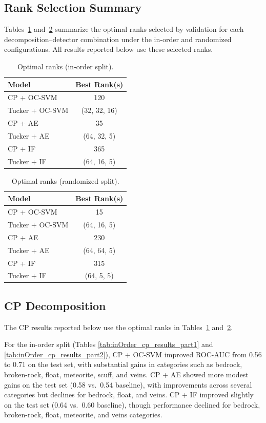 \documentclass[pdflatex,sn-mathphys-ay]{sn-jnl}
\begin{document}
\subsection{Rank Selection Summary}
Tables~\ref{tab:best_ranks_inorder} and~\ref{tab:best_ranks_random} summarize the optimal ranks selected by validation for each decomposition–detector combination under the in-order and randomized configurations. All results reported below use these selected ranks.

\begin{table}
\centering
\begin{tabular}{lc}
\hline
\textbf{Model} & \textbf{Best Rank(s)} \\
\hline
CP + OC-SVM    & 120 \\
Tucker + OC-SVM& (32, 32, 16) \\
CP + AE        & 35 \\
Tucker + AE    & (64, 32, 5) \\
CP + IF        & 365 \\
Tucker + IF    & (64, 16, 5) \\
\hline
\end{tabular}
\caption{Optimal ranks (in-order split).}
\label{tab:best_ranks_inorder}
\end{table}

\begin{table}
\centering
\begin{tabular}{lc}
\hline
\textbf{Model} & \textbf{Best Rank(s)} \\
\hline
CP + OC-SVM    & 15 \\
Tucker + OC-SVM& (64, 16, 5) \\
CP + AE        & 230 \\
Tucker + AE    & (64, 64, 5) \\
CP + IF        & 315 \\
Tucker + IF    & (64, 5, 5) \\
\hline
\end{tabular}
\caption{Optimal ranks (randomized split).}
\label{tab:best_ranks_random}
\end{table}

\subsection{CP Decomposition}
The CP results reported below use the optimal ranks in Tables~\ref{tab:best_ranks_inorder} and~\ref{tab:best_ranks_random}.  

For the in-order split (Tables \ref{tab:inOrder_cp_results_part1} and \ref{tab:inOrder_cp_results_part2}), CP + OC-SVM improved ROC-AUC from 0.56 to 0.71 on the test set, with substantial gains in categories such as bedrock, broken-rock, float, meteorite, scuff, and veins. CP + AE showed more modest gains on the test set (0.58 vs.\ 0.54 baseline), with improvements across several categories but declines for bedrock, float, and veins. CP + IF improved slightly on the test set (0.64 vs.\ 0.60 baseline), though performance declined for bedrock, broken-rock, float, meteorite, and veins categories.  
\end{document}
